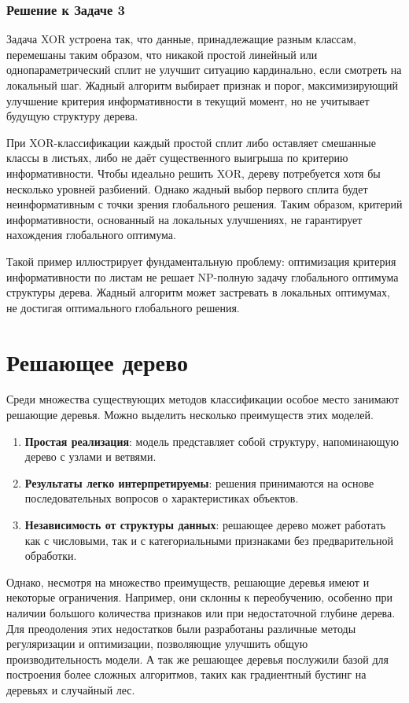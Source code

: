\begin{itemize}
\subsubsection*{Решение к Задаче 3}

Задача XOR устроена так, что данные, принадлежащие разным классам, перемешаны таким образом, что никакой простой линейный или однопараметрический сплит не улучшит ситуацию кардинально, если смотреть на локальный шаг. Жадный алгоритм выбирает признак и порог, максимизирующий улучшение критерия информативности в текущий момент, но не учитывает будущую структуру дерева.

При XOR-классификации каждый простой сплит либо оставляет смешанные классы в листьях, либо не даёт существенного выигрыша по критерию информативности. Чтобы идеально решить XOR, дереву потребуется хотя бы несколько уровней разбиений. Однако жадный выбор первого сплита будет неинформативным с точки зрения глобального решения. Таким образом, критерий информативности, основанный на локальных улучшениях, не гарантирует нахождения глобального оптимума.

Такой пример иллюстрирует фундаментальную проблему: оптимизация критерия информативности по листам не решает NP-полную задачу глобального оптимума структуры дерева. Жадный алгоритм может застревать в локальных оптимумах, не достигая оптимального глобального решения.


\section{Решающее дерево}
Среди множества существующих методов классификации особое место занимают решающие деревья.
Можно выделить несколько преимуществ этих моделей.
\begin{enumerate}
    \item \textbf{Простая реализация}: модель представляет собой структуру, напоминающую дерево с узлами и ветвями.
    \item \textbf{Результаты легко интерпретируемы}: решения принимаются на основе последовательных вопросов о характеристиках объектов.
    \item \textbf{Независимость от структуры данных}: решающее дерево может работать как с числовыми, так и с категориальными признаками без предварительной обработки.

\end{enumerate}
Однако, несмотря на множество преимуществ, решающие деревья имеют и некоторые ограничения. Например, они склонны к переобучению, особенно при наличии большого количества признаков или при недостаточной глубине дерева.
Для преодоления этих недостатков были разработаны различные методы регуляризации и оптимизации, позволяющие улучшить общую производительность модели. А так же решающее деревья послужили базой для построения более сложных алгоритмов, таких как градиентный бустинг на деревьях и случайный лес.


\end{itemize}
